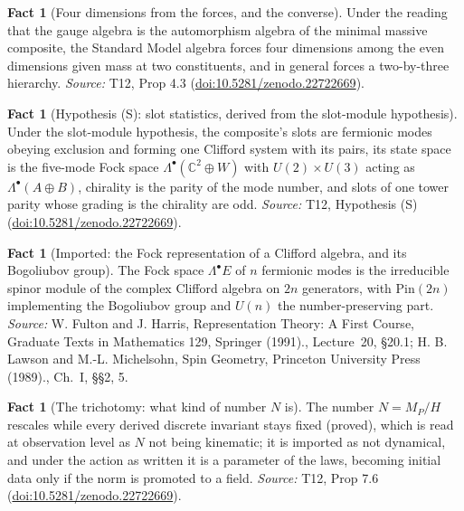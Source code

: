 \documentclass[11pt]{article}
\theoremstyle{definition}
\newtheorem{fact}[theorem]{Fact}
\theoremstyle{plain}
\providecommand{\C}{}\renewcommand{\C}{\mathbb{C}}
\begin{document}
\begin{fact}[Four dimensions from the forces, and the converse]\label{c:standard-model.four-dimensions-forces-converse}
Under the reading that the gauge algebra is the automorphism algebra of the minimal massive composite, the Standard Model algebra forces four dimensions among the even dimensions given mass at two constituents, and in general forces a two-by-three hierarchy.
\emph{Source:} T12, Prop 4.3 (\href{https://doi.org/10.5281/zenodo.22722669}{doi:10.5281/zenodo.22722669}).
\end{fact}

\begin{fact}[Hypothesis (S): slot statistics, derived from the slot-module hypothesis]\label{c:standard-model.hyp-s-slot-statistics}
Under the slot-module hypothesis, the composite's slots are fermionic modes obeying exclusion and forming one Clifford system with its pairs, its state space is the five-mode Fock space $\Lambda^{\bullet}(\C^{2} \oplus W)$ with $U(2) \times U(3)$ acting as $\Lambda^{\bullet}(A \oplus B)$, chirality is the parity of the mode number, and slots of one tower parity whose grading is the chirality are odd.
\emph{Source:} T12, Hypothesis (S) (\href{https://doi.org/10.5281/zenodo.22722669}{doi:10.5281/zenodo.22722669}).
\end{fact}

\begin{fact}[Imported: the Fock representation of a Clifford algebra, and its Bogoliubov group]\label{c:standard-model.imported-fock-representation-clifford-algebra-bogoliubov}
The Fock space $\Lambda^{\bullet}E$ of $n$ fermionic modes is the irreducible spinor module of the complex Clifford algebra on $2n$ generators, with $\mathrm{Pin}(2n)$ implementing the Bogoliubov group and $U(n)$ the number-preserving part.
\emph{Source:} W. Fulton and J. Harris, Representation Theory: A First Course, Graduate Texts in Mathematics 129, Springer (1991)., Lecture~20, \S 20.1; H. B. Lawson and M.-L. Michelsohn, Spin Geometry, Princeton University Press (1989)., Ch.~I, \S\S 2, 5.
\end{fact}

\begin{fact}[The trichotomy: what kind of number $N$ is]\label{c:standard-model.trichotomy-what-kind-number}
The number $N = M_{P}/H$ rescales while every derived discrete invariant stays fixed (proved), which is read at observation level as $N$ not being kinematic; it is imported as not dynamical, and under the action as written it is a parameter of the laws, becoming initial data only if the norm is promoted to a field.
\emph{Source:} T12, Prop 7.6 (\href{https://doi.org/10.5281/zenodo.22722669}{doi:10.5281/zenodo.22722669}).
\end{fact}
\end{document}
